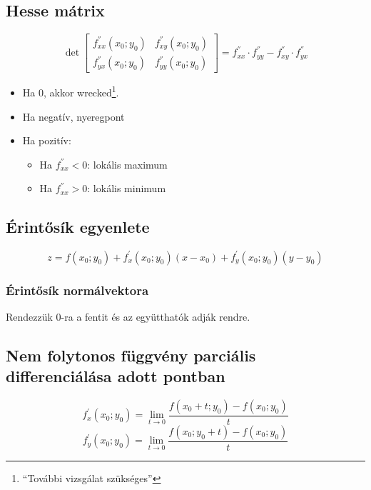 \documentclass[a4paper,12pt]{article}
\begin{document}
\subsection{Hesse mátrix}
\begin{equation}
  \det
\begin{bmatrix}
  f^{''}_{xx}(x_0;y_0) & f^{''}_{xy}(x_0;y_0) \\
  f^{''}_{yx}(x_0;y_0) & f^{''}_{yy}(x_0;y_0)
\end{bmatrix}
= f^{''}_{xx} \cdot f^{''}_{yy} - f^{''}_{xy} \cdot  f^{''}_{yx}
\end{equation}
\begin{itemize}
\item Ha 0, akkor wrecked\footnote{``További vizsgálat szükséges''}.
\item Ha negatív, nyeregpont
\item Ha pozitív:
  \begin{itemize}
  \item Ha $f^{''}_{xx} < 0$: lokális maximum
  \item Ha $f^{''}_{xx} > 0$: lokális minimum
  \end{itemize}
\end{itemize}
\subsection{Érintősík egyenlete}
\begin{equation}
z = f(x_0;y_0) + f^{'}_x(x_0;y_0)(x-x_0) + f^{'}_y(x_0;y_0)(y-y_0)
\end{equation}
\subsubsection{Érintősík normálvektora}
Rendezzük 0-ra a fentit és az együtthatók adják rendre.

\subsection{Nem folytonos függvény parciális differenciálása adott pontban}

\begin{equation}
  f^{'}_x(x_0;y_0) = \lim_{t \rightarrow 0} \frac{f(x_0+t;y_0) - f(x_0;y_0)}{t}
\end{equation}
\begin{equation}
  f^{'}_y(x_0;y_0) = \lim_{t \rightarrow 0} \frac{f(x_0;y_0+t) - f(x_0;y_0)}{t}
\end{equation}
\end{document}
